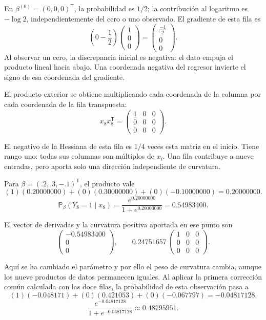 \documentclass[11pt,a4paper]{article}
\newcommand{\Prob}{\mathbb P}
\newcommand{\T}{^{\mathsf T}}
\begin{document}
En \(\beta^{(0)}=(0,0,0)\T\), la probabilidad es \(1/2\);
la contribución al logaritmo es \(-\log2\), independientemente
del cero o uno observado. El gradiente de esta fila es
\[
\left(0-\frac12\right)\begin{pmatrix}1\\0\\0\end{pmatrix}=\begin{pmatrix}\frac{-1}{2}\\0\\0\end{pmatrix}.
\]
Al observar un cero, la discrepancia inicial es negativa: el dato empuja el producto lineal hacia abajo. Una coordenada negativa del regresor invierte el signo de esa coordenada del gradiente.

El producto exterior se obtiene multiplicando cada coordenada
de la columna por cada coordenada de la fila transpuesta:
\[
x_{8}x_{8}\T=\begin{pmatrix}1&0&0\\0&0&0\\0&0&0\end{pmatrix}.
\]

El negativo de la Hessiana de esta fila es \(1/4\)
veces esta matriz en el inicio. Tiene rango uno:
todas sus columnas son múltiplos de \(x_i\).
Una fila contribuye a nueve entradas, pero aporta
solo una dirección independiente de curvatura.

Para \(\beta=(.2,.3,-.1)\T\), el producto vale
\[
(1)(0.20000000)+(0)(0.30000000)+(0)(-0.10000000)=0.20000000.
\]
\[
\Prob_\beta(Y_{8}=1\mid x_{8})=\frac{e^{0.20000000}}{1+e^{0.20000000}}=0.54983400.
\]

El vector de derivadas y la curvatura positiva aportada
en ese punto son
\[
\begin{pmatrix}-0.54983400\\0\\0\end{pmatrix},\qquad 0.24751657\,\begin{pmatrix}1&0&0\\0&0&0\\0&0&0\end{pmatrix}.
\]

Aquí se ha cambiado el parámetro y por ello el peso de
curvatura cambia, aunque los nueve productos de datos
permanecen iguales.
Al aplicar la primera corrección común calculada con las doce filas,
la probabilidad de esta observación pasa a
\[
(1)(-0.048171)+(0)(0.421053)+(0)(-0.067797)=-0.04817128.
\]
\[
\frac{e^{-0.04817128}}{1+e^{-0.04817128}}\approx0.48795951.
\]
\end{document}
